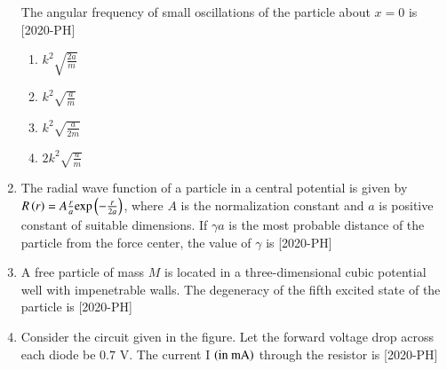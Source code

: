 \documentclass[journal]{IEEEtran}
\begin{document}
\begin{enumerate}[start=40]
The angular frequency of small oscillations of the particle about $x=0$ is \hfill{[2020-PH]}\\
\begin{enumerate}
    \item $k^2 \sqrt{\frac{2a}{m}}$\\
    \item $k^2 \sqrt{\frac{a}{m}}$\\
    \item $k^2 \sqrt{\frac{a}{2m}}$\\
    \item $2k^2 \sqrt{\frac{a}{m}}$\\
\end{enumerate}
\item The radial wave function of a particle in a central potential is given by $R\left(r\right)=A\frac{r}{a}\text{exp}\left(-\frac{r}{2a}\right)$, where $A$ is the normalization constant and $a$ is positive constant of suitable dimensions. If $\gamma a$ is the most probable distance of the particle from the force center, the value of $\gamma$ is \underline{\hspace{1cm}} \hfill{[2020-PH]}\\
\item A free particle of mass $M$ is located in a three-dimensional cubic potential well with impenetrable walls. The degeneracy of the fifth excited state of the particle is \underline{\hspace{1cm}} \hfill{[2020-PH]}\\
\item Consider the circuit given in the figure. Let the forward voltage drop across each diode be $0.7$ V. The current I $\left(\text{in mA}\right)$ through the resistor is \underline{\hspace{1cm}} \hfill{[2020-PH]}\\
\begin{figure}[H]
			\centering
			
			\label{52}
		\end{figure}
\end{enumerate}
\end{document}
